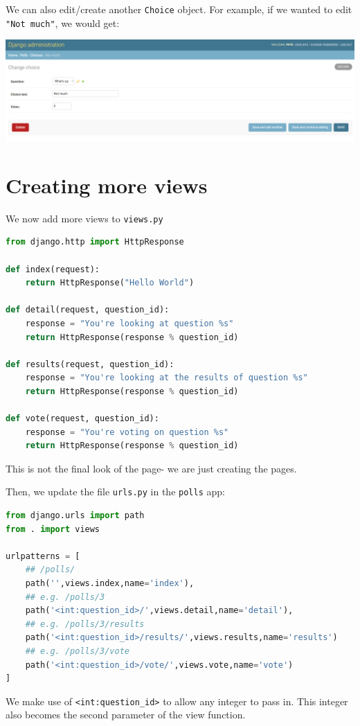 \documentclass[a4paper, openany]{memoir}
\begin{document}
    We can also edit/create another \texttt{Choice} object. For example, if we wanted to edit \texttt{"Not much"}, we would get:
    \begin{center}
        \includegraphics[scale=0.3]{src/Django6.PNG}
    \end{center}
    \newpage

    \section{Creating more views}
    We now add more views to \texttt{views.py}
\begin{lstlisting}[language=python]
from django.http import HttpResponse

def index(request):
    return HttpResponse("Hello World")

def detail(request, question_id):
    response = "You're looking at question %s"
    return HttpResponse(response % question_id)

def results(request, question_id):
    response = "You're looking at the results of question %s"
    return HttpResponse(response % question_id)
    
def vote(request, question_id):
    response = "You're voting on question %s"
    return HttpResponse(response % question_id)
\end{lstlisting}
    This is not the final look of the page- we are just creating the pages.

    Then, we update the file \texttt{urls.py} in the \texttt{polls} app:
\begin{lstlisting}[language=python]
from django.urls import path
from . import views

urlpatterns = [
    ## /polls/
    path('',views.index,name='index'),
    ## e.g. /polls/3
    path('<int:question_id>/',views.detail,name='detail'),
    ## e.g. /polls/3/results
    path('<int:question_id>/results/',views.results,name='results')
    ## e.g. /polls/3/vote
    path('<int:question_id>/vote/',views.vote,name='vote')
]
\end{lstlisting}
    We make use of \texttt{<int:question\_id>} to allow any integer to pass in. This integer also becomes the second parameter of the view function.
\end{document}
